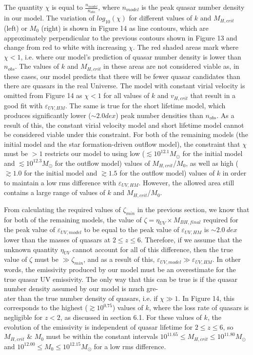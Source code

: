 \documentclass[12pt]{article}%
\begin{document}
The quantity $\chi$ is equal to $\frac{n_{model}}{n_{obs}}$, where $n_{model}$ is the peak quasar number density in our model. The variation of $log_{10}(\chi)$ for different values of $k$ and $M_{H,crit}$ (left) or $M_0$ (right) is shown in Figure 14 as line contours, which are approximately perpendicular to the previous contours shown in Figure 13 and change from red to white with increasing $\chi$. The red shaded areas mark where $\chi<1$, i.e. where our model's prediction of quasar number density is lower than $n_{obs}$. The values of $k$ and $M_{H,crit}$ in these areas are not considered viable as, in these cases, our model predicts that there will be fewer quasar candidates than there are quasars in the real Universe. The model with constant virial velocity is omitted from Figure 14 as $\chi<1$ for all values of $k$ and $v_{H,crit}$ that result in a good fit with $\varepsilon_{UV,HM}$. The same is true for the short lifetime model, which produces significantly lower ($\sim2.0dex$) peak number densities than $n_{obs}$. As a result of this, the constant virial velocity model and short lifetime model cannot be considered viable under this constraint. For both of the remaining models (the initial model and the star formation-driven outflow model), the constraint that $\chi$ must be $>1$ restricts our model to using low ($\lesssim10^{12.1}M_\odot$ for the initial model and $\lesssim10^{12.3}M_\odot$ for the outflow model) values of $M_{H,crit}$/$M_0$, as well as high ($\gtrsim1.0$ for the initial model and $\gtrsim1.5$ for the outflow model) values of $k$ in order to maintain a low rms difference with $\varepsilon_{UV,HM}$. However, the allowed area still contains a large range of values of $k$ and $M_{H,crit}$/$M_0$.\par

From calculating the required values of $\zeta_{min}$ in the previous section, we know that for both of the remaining models, the value of $\zeta=\eta_{UV}\times M_{BH,final}$ required for the peak value of $\varepsilon_{UV,model}$ to be equal to the peak value of $\varepsilon_{UV,HM}$ is $\sim2.0\:dex$ lower than the masses of quasars at $2\leq z\leq6$. Therefore, if we assume that the unknown quantity $\eta_{UV}$ cannot account for all of this difference, then the true value of $\zeta$ must be $\gg\zeta_{min}$, and as a result of this, $\varepsilon_{UV,model}\gg\varepsilon_{UV,HM}$. In other words, the emissivity produced by our model must be an overestimate for the true quasar UV emissivity. The only way that this can be true is if the quasar number density assumed by our model is much gre-\\ater than the true number density of quasars, i.e. if $\chi\gg1$. In Figure 14, this corresponds to the highest ($\gtrsim10^{0.75}$) values of $k$, where the loss rate of quasars is negligible for $z<2$, as discussed in section 6.1. For these values of $k$, the evolution of the emissivity is independent of quasar lifetime for $2\leq z\leq6$, so $M_{H,crit}$ \& $M_0$ must be within the constant intervals $10^{11.65}\leq M_{H,crit}\leq10^{11.80}M_\odot$ and $10^{12.00}\leq M_0\leq10^{12.15}M_\odot$ for a low rms difference.
\end{document}
